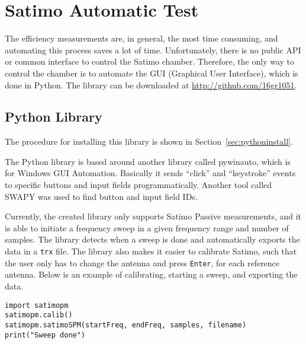 \section{Satimo Automatic Test}
\label{sec:satimo_python}
The efficiency measurements are, in general, the most time consuming, and automating this process saves a lot of time. Unfortunately, there is no public API or common interface to control the Satimo chamber. Therefore, the only way to control the chamber is to automate the GUI (Graphical User Interface), which is done in Python. The library can be downloaded at \url{http://github.com/16gr1051}.

\subsection{Python Library}
The procedure for installing this library is shown in Section~\ref{sec:pythoninstall}.

The Python library is based around another library called pywinauto, which is for Windows GUI Automation. Basically it sends ``click'' and ``keystroke'' events to specific buttons and input fields programmatically. Another tool called SWAPY was used to find button and input field IDs. 

Currently, the created library only supports Satimo Passive measurements, and it is able to initiate a frequency sweep in a given frequency range and number of samples. The library detects when a sweep is done and automatically exports the data in a \verb|trx| file. The library also makes it easier to calibrate Satimo, such that the user only has to change the antenna and press \verb|Enter|, for each reference antenna. Below is an example of calibrating, starting a sweep, and exporting the data. 
\begin{lstlisting}
import satimopm
satimopm.calib()
satimopm.satimoSPM(startFreq, endFreq, samples, filename)
print("Sweep done")
\end{lstlisting}
 
